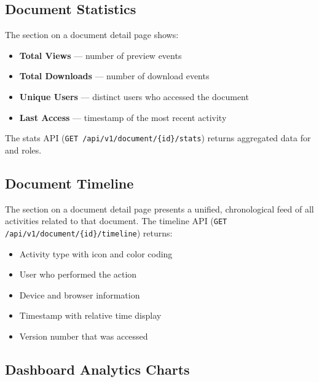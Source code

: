 \subsection{Document Statistics}

The  section on a document detail page shows:

\begin{itemize}[leftmargin=18pt]
  \item \textbf{Total Views} --- number of preview events
  \item \textbf{Total Downloads} --- number of download events
  \item \textbf{Unique Users} --- distinct users who accessed
        the document
  \item \textbf{Last Access} --- timestamp of the most recent
        activity
\end{itemize}

The stats API (\texttt{GET /api/v1/document/\{id\}/stats})
returns aggregated data for  and 
roles.

\subsection{Document Timeline}

The  section on a document detail page
presents a unified, chronological feed of all activities
related to that document. The timeline API
(\texttt{GET /api/v1/document/\{id\}/timeline}) returns:

\begin{itemize}[leftmargin=18pt]
  \item Activity type with icon and color coding
  \item User who performed the action
  \item Device and browser information
  \item Timestamp with relative time display
  \item Version number that was accessed
\end{itemize}

\subsection{Dashboard Analytics Charts}

